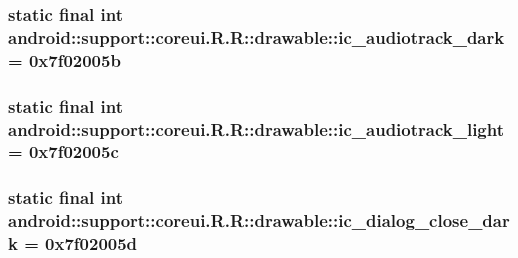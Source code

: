 \hypertarget{classandroid_1_1support_1_1coreui_1_1_r_1_1drawable_73f3cc81b63300c48d6d0a37c904c65c}{
\subsubsection[{ic\_\-audiotrack\_\-dark}]{\setlength{\rightskip}{0pt plus 5cm}static final int android::support::coreui.R.R::drawable::ic\_\-audiotrack\_\-dark = 0x7f02005b}}
\label{classandroid_1_1support_1_1coreui_1_1_r_1_1drawable_73f3cc81b63300c48d6d0a37c904c65c}


\hypertarget{classandroid_1_1support_1_1coreui_1_1_r_1_1drawable_f8675743a387674cacc3c3d7190e9846}{
\subsubsection[{ic\_\-audiotrack\_\-light}]{\setlength{\rightskip}{0pt plus 5cm}static final int android::support::coreui.R.R::drawable::ic\_\-audiotrack\_\-light = 0x7f02005c}}
\label{classandroid_1_1support_1_1coreui_1_1_r_1_1drawable_f8675743a387674cacc3c3d7190e9846}


\hypertarget{classandroid_1_1support_1_1coreui_1_1_r_1_1drawable_f44f238079ffb1d4d75eb5dc5e5a12de}{
\subsubsection[{ic\_\-dialog\_\-close\_\-dark}]{\setlength{\rightskip}{0pt plus 5cm}static final int android::support::coreui.R.R::drawable::ic\_\-dialog\_\-close\_\-dark = 0x7f02005d}}
\label{classandroid_1_1support_1_1coreui_1_1_r_1_1drawable_f44f238079ffb1d4d75eb5dc5e5a12de}


